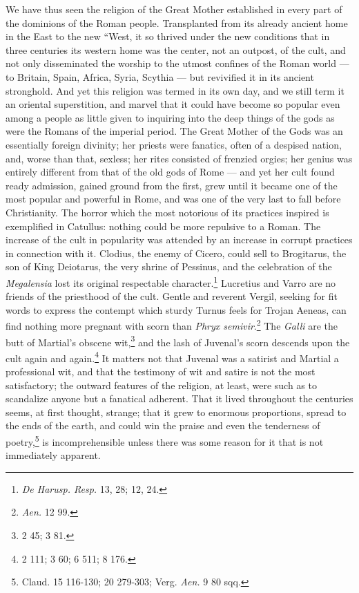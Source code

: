 \documentclass[a4paper, 11pt, oneside, polutonikogreek, english]{article}
\begin{document}
We have thus seen the religion of the Great Mother established in every part of the dominions of the Roman people. Transplanted from its already ancient home in the East to the new ``West, it so thrived under the new conditions that in three centuries its western home was the center, not an outpost, of the cult, and not only disseminated the worship to the utmost confines of the Roman world --- to Britain, Spain, Africa, Syria, Scythia --- but revivified it in its ancient stronghold. And yet this religion was termed in its own day, and we still term it an oriental superstition, and marvel that it could have become so popular even among a people as little given to inquiring into the deep things of the gods as were the Romans of the imperial period. The Great Mother of the Gods was an essentially foreign divinity; her priests were fanatics, often of a despised nation, and, worse than that, sexless; her rites consisted of frenzied orgies; her genius was entirely different from that of the old gods of Rome --- and yet her cult found ready admission, gained ground from the first, grew until it became one of the most popular and powerful in Rome, and was one of the very last to fall before Christianity. The horror which the most notorious of its practices inspired is exemplified in Catullus: nothing could be more repulsive to a Roman. The increase of the cult in popularity was attended by an increase in corrupt practices in connection with it. Clodius, the enemy of Cicero, could sell to Brogitarus, the son of King Deiotarus, the very shrine of Pessinus, and the celebration of the \emph{Megalensia} lost its original respectable character.\footnote{\emph{De Harusp. Resp.} 13, 28; 12, 24.} Lucretius and Varro are no friends of the priesthood of the cult. Gentle and reverent Vergil, seeking for fit words to express the contempt which sturdy Turnus feels for Trojan Aeneas, can find nothing more pregnant with scorn than \emph{Phryx semivir}.\footnote{\emph{Aen.} 12 99.} The \emph{Galli} are the butt of Martial's obscene wit,\footnote{2 45; 3 81.} and the lash of Juvenal's scorn descends upon the cult again and again.\footnote{2 111; 3 60; 6 511; 8 176.} It matters not that Juvenal was a satirist and Martial a professional wit, and that the testimony of wit and satire is not the most satisfactory; the outward features of the religion, at least, were such as to scandalize anyone but a fanatical adherent. That it lived throughout the centuries seems, at first thought, strange; that it grew to enormous proportions, spread to the ends of the earth, and could win the praise and even the tenderness of poetry,\footnote{Claud. 15 116-130; 20 279-303; Verg. \emph{Aen.} 9 80 sqq.} is incomprehensible unless there was some reason for it that is not immediately apparent.
\end{document}
